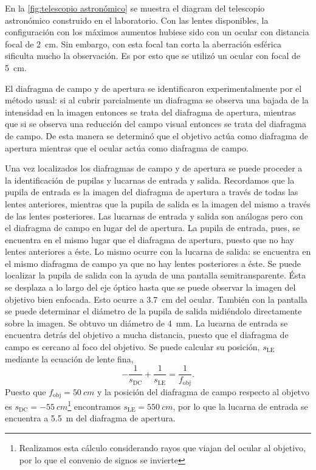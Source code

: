 \documentclass[12pt]{article}
\numberwithin{table}{section}
\numberwithin{figure}{section}
\numberwithin{equation}{section}
\begin{document}
En la \cref{fig:telescopio astronómico} se muestra el diagram del telescopio astronómico construido en el laboratorio. Con las lentes disponibles, la configuración con los máximos aumentos hubiese sido con un ocular con distancia focal de \SI{2}{cm}. Sin embargo, con esta focal tan corta la aberración esférica sificulta mucho la observación. Es por esto que se utilizó un ocular con focal de \SI{5}{cm}.

El diafragma de campo y de apertura se identificaron experimentalmente por el método usual: si al cubrir parcialmente un diafragma se observa una bajada de la intensidad en la imagen entonces se trata del diafragma de apertura, mientras que si se observa una reducción del campo visual entonces se trata del diafragma de campo. De esta manera se determinó que el objetivo actúa como diafragma de apertura mientras que el ocular actúa como diafragma de campo. 

Una vez localizados los diafragmas de campo y de apertura se puede proceder a la identificación de pupilas y lucarnas de entrada y salida. Recordamos que la pupila de entrada es la imagen del diafragma de apertura a través de todas las lentes anteriores, mientras que la pupila de salida es la imagen del mismo a través de las lentes posteriores. Las lucarnas de entrada y salida son análogas pero con el diafragma de campo en lugar del de apertura. La pupila de entrada, pues, se encuentra en el mismo lugar que el diafragma de apertura, puesto que no hay lentes anteriores a éste. Lo mismo ocurre con la lucarna de salida: se encuentra en el mismo diafragma de campo ya que no hay lentes posteriores a éste. Se puede localizar la pupila de salida con la ayuda de una pantalla semitransparente. Ésta se desplaza a lo largo del eje óptico hasta que se puede observar la imagen del objetivo bien enfocada. Esto ocurre a \SI{3.7}{cm} del ocular. También con la pantalla se puede determinar el diámetro de la pupila de salida midiéndolo directamente sobre la imagen. Se obtuvo un diámetro de \SI{4}{mm}.
La lucarna de entrada se encuentra detrás del objetivo a mucha distancia, puesto que el diafragma de campo es cercano al foco del objetivo. Se puede calcular su posición, \( s_\text{LE} \) mediante la ecuación de lente fina,
\begin{equation} \label{eqn:LE astronomico}
	-\frac{1}{s_\text{DC}} + \frac{1}{s_\text{LE}} = \frac{1}{f_\text{obj}}.
\end{equation}
Puesto que \( f_\text{obj} = \SI{50}{cm} \) y la posición del diafragma de campo respecto al objetvo es \( s_\text{DC} = \SI{-55}{cm} \)\footnote{Realizamos esta cálculo considerando rayos que viajan del ocular al objetivo, por lo que el convenio de signos se invierte} encontramos \( s_\text{LE} = \SI{550}{cm} \), por lo que la lucarna de entrada se encuentra a \SI{5.5}{m} del diafragma de apertura.
\end{document}
